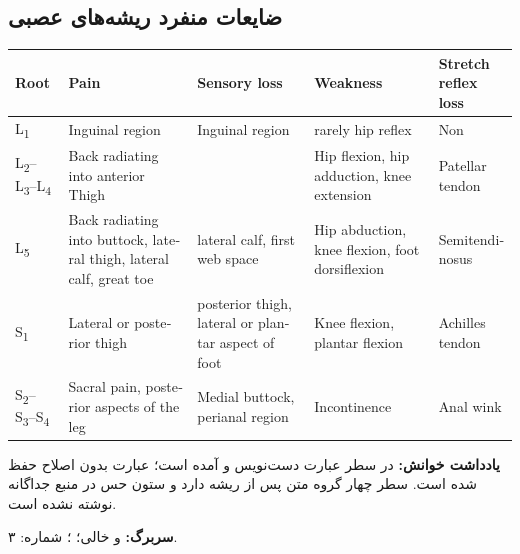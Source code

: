 \documentclass[12pt,a4paper]{article}
\begin{document}
\subsection*{ضایعات منفرد ریشه‌های عصبی}
\begin{latin}
\small
\setlength{\tabcolsep}{4pt}
\renewcommand{\arraystretch}{1.25}
\begin{longtable}{|p{}|p{}|p{}|p{}|p{}|}
\hline
Root & Pain & Sensory loss & Weakness & Stretch reflex loss \\
\hline
\endhead
L\textsubscript{1} & Inguinal region & Inguinal region & rarely hip reflex & Non \\
\hline
L\textsubscript{2}--L\textsubscript{3}--L\textsubscript{4} & Back radiating into anterior Thigh & & Hip flexion, hip adduction, knee extension & Patellar tendon \\
\hline
L\textsubscript{5} & Back radiating into buttock, lateral thigh, lateral calf, great toe & lateral calf, first web space & Hip abduction, knee flexion, foot dorsiflexion & Semi\-tendinosus \\
\hline
S\textsubscript{1} & Lateral or posterior thigh & posterior thigh, lateral or plantar aspect of foot & Knee flexion, plantar flexion & Achilles tendon \\
\hline
S\textsubscript{2}--S\textsubscript{3}--S\textsubscript{4} & Sacral pain, posterior aspects of the leg & Medial buttock, perianal region & Incontinence & Anal wink \\
\hline
\end{longtable}
\end{latin}
\textbf{یادداشت خوانش:} در سطر  عبارت دست‌نویس  و  آمده است؛ عبارت بدون اصلاح حفظ شده است. سطر  چهار گروه متن پس از ریشه دارد و ستون حس در منبع جداگانه نوشته نشده است.

\textbf{سربرگ:}  و  خالی؛ ؛ شماره: ۳.
\end{document}
